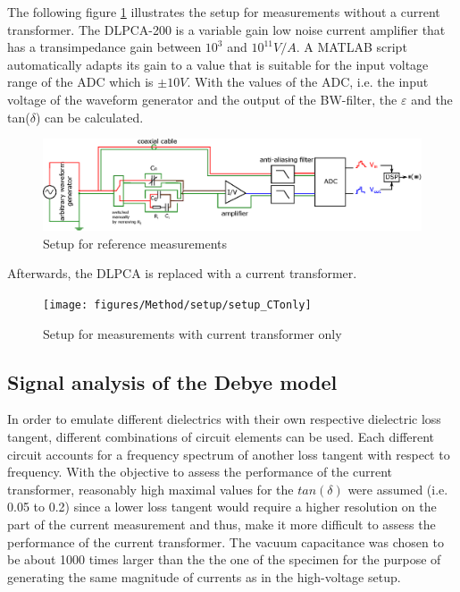 The following figure \ref{sec.setup_amplifier} illustrates the setup for measurements without a current transformer. The DLPCA-200 is a variable gain low noise current amplifier that has a transimpedance gain between $10^3$ and $10^{11} V/A$. A MATLAB script automatically adapts its gain to a value that is suitable for the input voltage range of the ADC which is $\pm 10V$. With the values of the ADC, i.e. the input voltage of the waveform generator and the output of the BW-filter, the $\varepsilon$ and the tan($\delta$) can be calculated. 

\begin{figure}[htbp]
	\centering
	\includegraphics[width=\textwidth]{figures/Method/setup/setup_DLPCA.eps}		
	\caption[Kurze Abbildungsbeschreibung]{Setup for reference measurements \protect\footnotemark} 
	
	\label{sec.setup_amplifier}

\end{figure}


Afterwards, the DLPCA is replaced with a current transformer. 
\begin{figure}[htbp]
	\centering
	\texttt{[image: figures/Method/setup/setup\_CTonly]}		
	\caption[Kurze Abbildungsbeschreibung]{Setup for measurements with current transformer only \protect\footnotemark}
	\label{sec.setup}

\end{figure}

\subsection{Signal analysis of the Debye model}

In order to emulate different dielectrics with their own respective dielectric loss tangent, different combinations of circuit elements can be used.
Each different circuit accounts for a frequency spectrum of another loss tangent with respect to frequency. With the objective to assess the performance of the current transformer, reasonably high maximal values for the $tan\left(\delta\right)$ were assumed (i.e. 0.05 to 0.2) since a lower loss tangent
would require a higher resolution on the part of the current measurement and thus, make it more difficult to assess the performance of the current transformer. The vacuum capacitance was chosen to be about 1000 times larger than
the the one of the specimen for the purpose of generating the same magnitude of currents as in the high-voltage setup.


